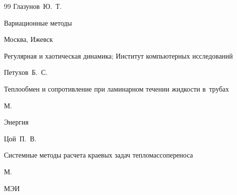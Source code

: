 \begin{thebibliography}{99}
\by Глазунов~Ю.~Т.

\book Вариационные методы

\publaddr Москва, Ижевск

\publ Регулярная и хаотическая динамика; Институт компьютерных исследований






\by Петухов~Б.~С.

\book Теплообмен и сопротивление при ламинарном течении жидкости в~трубах

\publaddr М.

\publ Энергия






\by Цой~П.~В.

\book Системные методы расчета краевых задач тепломассопереноса

\publaddr  М.

\publ МЭИ












%









%




\end{thebibliography}
